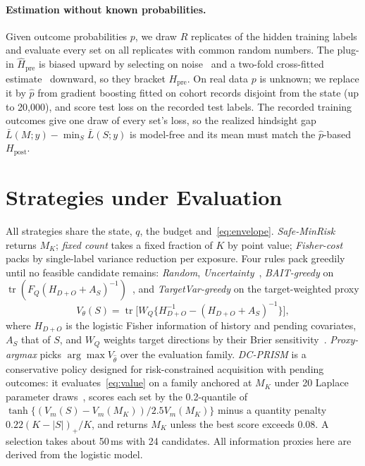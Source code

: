 \documentclass[runningheads]{llncs}
\begin{document}
\paragraph{Estimation without known probabilities.} Given outcome probabilities $p$, we draw $R$ replicates of the hidden training labels and evaluate every set on all replicates with common random numbers. The plug-in $\widehat H_{\mathrm{pre}}$ is biased upward by selecting on noise~\cite{smith2006optimizer,cawley2010overfitting} and a two-fold cross-fitted estimate~\cite{chernozhukov2018double} downward, so they bracket $H_{\mathrm{pre}}$. On real data $p$ is unknown; we replace it by $\hat p$ from gradient boosting fitted on cohort records disjoint from the state (up to 20{,}000), and score test loss on the recorded test labels. The recorded training outcomes give one draw of every set's loss, so the realized hindsight gap $\bar L(M;y)-\min_S\bar L(S;y)$ is model-free and its mean must match the $\hat p$-based $H_{\mathrm{post}}$.

\section{Strategies under Evaluation}
\label{sec:policy}
All strategies share the state, $q$, the budget and~\eqref{eq:envelope}. \emph{Safe-MinRisk} returns $M_K$; \emph{fixed count} takes a fixed fraction of $K$ by point value; \emph{Fisher-cost} packs by single-label variance reduction per exposure. Four rules pack greedily until no feasible candidate remains: \emph{Random}, \emph{Uncertainty}~\cite{lewis1994sequential}, \emph{BAIT-greedy} on $\operatorname{tr}(F_Q(H_{D+O}+A_S)^{-1})$~\cite{ash2021fishing}, and \emph{TargetVar-greedy} on the target-weighted proxy
\begin{equation}
 V_\theta(S)=\operatorname{tr}\big[W_Q\{H_{D+O}^{-1}-(H_{D+O}+A_S)^{-1}\}\big],\label{eq:value}
\end{equation}
where $H_{D+O}$ is the logistic Fisher information of history and pending covariates, $A_S$ that of $S$, and $W_Q$ weights target directions by their Brier sensitivity~\cite{yu2006transductive,bickfordsmith2023prediction}. \emph{Proxy-argmax} picks $\arg\max V_{\hat\theta}$ over the evaluation family. \emph{DC-PRISM} is a conservative policy designed for risk-constrained acquisition with pending outcomes: it evaluates~\eqref{eq:value} on a family anchored at $M_K$ under 20 Laplace parameter draws~\cite{mackay1992practical}, scores each set by the 0.2-quantile of $\tanh\{(V_m(S)-V_m(M_K))/2.5V_m(M_K)\}$ minus a quantity penalty $0.22(K-|S|)_+/K$, and returns $M_K$ unless the best score exceeds $0.08$. A selection takes about 50\,ms with 24 candidates. All information proxies here are derived from the logistic model.
\end{document}
